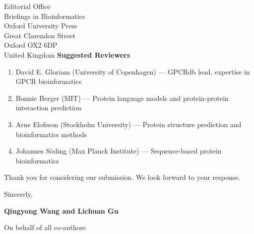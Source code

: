 \documentclass[11pt]{letter}
\begin{document}
\begin{letter}{Editorial Office\\
Briefings in Bioinformatics\\
Oxford University Press\\
Great Clarendon Street\\
Oxford OX2 6DP\\
United Kingdom}
\textbf{Suggested Reviewers}

\begin{enumerate}
    \item David E. Gloriam (University of Copenhagen) --- GPCRdb lead, expertise in GPCR bioinformatics
    \item Bonnie Berger (MIT) --- Protein language models and protein-protein interaction prediction
    \item Arne Elofsson (Stockholm University) --- Protein structure prediction and bioinformatics methods
    \item Johannes S\"oding (Max Planck Institute) --- Sequence-based protein bioinformatics
\end{enumerate}

\closing{Thank you for considering our submission. We look forward to your response.}

\vspace{0.5cm}

Sincerely,

\vspace{0.5cm}

\textbf{Qingyong Wang and Lichuan Gu}

On behalf of all co-authors

\end{letter}
\end{document}
